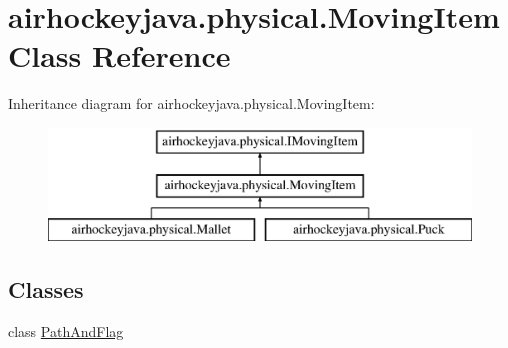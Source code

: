 \hypertarget{classairhockeyjava_1_1physical_1_1_moving_item}{}\section{airhockeyjava.\+physical.\+Moving\+Item Class Reference}
\label{classairhockeyjava_1_1physical_1_1_moving_item}
Inheritance diagram for airhockeyjava.\+physical.\+Moving\+Item\+:\begin{figure}[H]
\begin{center}
\leavevmode
\includegraphics[height=3.000000cm]{classairhockeyjava_1_1physical_1_1_moving_item}
\end{center}
\end{figure}
\subsection*{Classes}
\begin{DoxyCompactItemize}
\item 
class \hyperlink{classairhockeyjava_1_1physical_1_1_moving_item_1_1_path_and_flag}{Path\+And\+Flag}
\end{DoxyCompactItemize}
